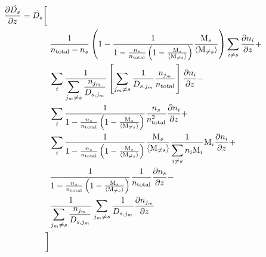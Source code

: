 \begin{equation}
\begin{split}
\frac{\partial\tilde{D_s}}{\partial z} = \tilde{D_s}\bigg[\; & \\
        &            \frac{1}{n_\text{total} - n_s}\left( 1 -
                           \frac{1}{1-\frac{n_s}{n_\text{total}}  \left(1 - \frac{\text{M}_s}{\langle\text{M}_{\neq s}\rangle}\right)}\frac{\text{M}_s}{\langle\text{M}_{\neq s}\rangle}
                     \right) \displaystyle\sum_{i\neq s}\frac{\partial n_i}{\partial z} 
+ \\
        &                \displaystyle\sum_i\frac{1}{\displaystyle\sum_{j_m \neq s}\frac{n_{j_m}}{D_{s,j_m}}}
                         \left[\sum_{j_m \neq s}\frac{1}{D_{s,j_m}}
                                 \frac{n_{j_m}}{n_\text{total}}\right]\frac{\partial n_{i}}{\partial z} 
- \\
        &                \displaystyle\sum_i\frac{1}{1-\frac{n_s}{n_\text{total}}  \left(1 - \frac{\text{M}_s}{\langle\text{M}_{\neq s}\rangle}\right)}
                         \frac{n_s}{n_\text{total}^2}\frac{\partial n_i}{\partial z} 
+ \\
        &                \displaystyle\sum_i\frac{1}{1-\frac{n_s}{n_\text{total}}  \left(1 - \frac{\text{M}_s}{\langle\text{M}_{\neq s}\rangle}\right)}
                                      \frac{\text{M}_s}{\langle\text{M}_{\neq s}\rangle}
                      \frac{1}{\displaystyle\sum_{i\neq s}n_i\text{M}_i} \text{M}_i\frac{\partial n_i}{\partial z} 
+ \\
        &                \frac{1}{1-\frac{n_s}{n_\text{total}}  \left(1 - \frac{\text{M}_s}{\langle\text{M}_{\neq s}\rangle}\right)}
                                \frac{1}{n_\text{total}}\frac{\partial n_s}{\partial z} 
- \\
        &                \frac{1}{\displaystyle\sum_{j_m \neq s}\frac{n_{j_m}}{D_{s,j_m}}}
                         \displaystyle\sum_{j_m \neq s}\frac{1}{D_{s,j_m}}
                                \frac{\partial n_{j_m}}{\partial z} 
\\ \bigg]
\end{split}
\end{equation}


